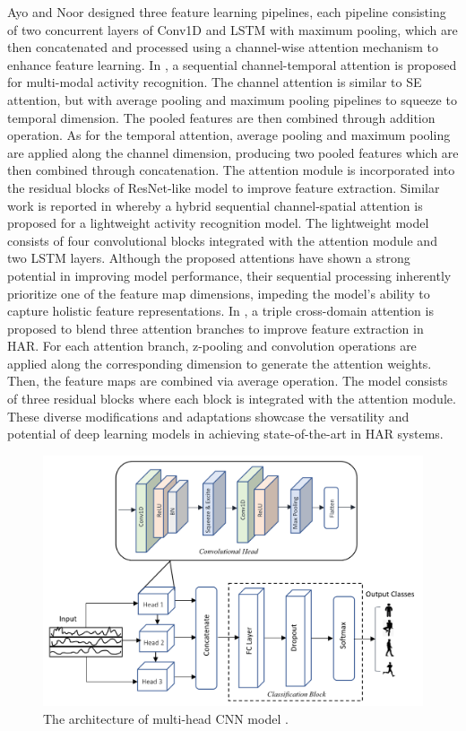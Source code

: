 \documentclass[preprint,12pt]{elsarticle}
\begin{document}
Ayo and Noor \citep{ige_deep_2023} designed three feature learning pipelines, each pipeline consisting of two concurrent layers of Conv1D and LSTM with maximum pooling, which are then concatenated and processed using a channel-wise attention mechanism to enhance feature learning. In \citep{gao_danhar_2021}, a sequential channel-temporal attention is proposed for multi-modal activity recognition. The channel attention is similar to SE attention, but with average pooling and maximum pooling pipelines to squeeze to temporal dimension. The pooled features are then combined through addition operation. As for the temporal attention, average pooling and maximum pooling are applied along the channel dimension, producing two pooled features which are then combined through concatenation. The attention module is incorporated into the residual blocks of ResNet-like model to improve feature extraction. Similar work is reported in \citep{agac_resource-efficient_2024} whereby a hybrid sequential channel-spatial attention is proposed for a lightweight activity recognition model. The lightweight model consists of four convolutional blocks integrated with the attention module and two LSTM layers. Although the proposed attentions have shown a strong potential in improving model performance, their sequential processing inherently prioritize one of the feature map dimensions, impeding the model's ability to capture holistic feature representations. In \citep{tang_triple_2022}, a triple cross-domain attention is proposed to blend three attention branches to improve feature extraction in HAR. For each attention branch, z-pooling \citep{misra_rotate_2020} and convolution operations are applied along the corresponding dimension to generate the attention weights. Then, the feature maps are combined via average operation. The model consists of three residual blocks where each block is integrated with the attention module. These diverse modifications and adaptations showcase the versatility and potential of deep learning models in achieving state-of-the-art in HAR systems.

\begin{figure}[h!]
    \centering
    \includegraphics[scale=0.5]{fig_har_multi-head_cnn.png}
    \caption{The architecture of multi-head CNN model \citep{khan_attention_2021}.}
    \label{fig_har_multi-head_cnn}
\end{figure}
\end{document}
